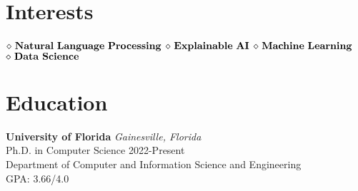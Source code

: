 \documentclass[a4paper,11pt]{article}
\begin{document}

\pagestyle{empty} %


\par{\par}
\bigskip
\section{Interests}
$\diamond {\bf \ Natural \ Language \ Processing}$
$\diamond {\bf \ Explainable\ AI}$
$\diamond {\bf \ Machine \ Learning}$  
$\diamond {\bf \ Data \ Science}$ 



\vspace{0.05in}
\section{Education}
{{\bf University of Florida} \hfill {\em Gainesville, Florida} 
\\{\normalsize Ph.D. in Computer Science} \hfill
 2022-Present
 \\ \small Department of Computer and Information Science and Engineering \hfill $\;$
 \\{\normalsize GPA: 3.66/4.0} \hfill }
\vspace{0.05in}
 
\end{document}
